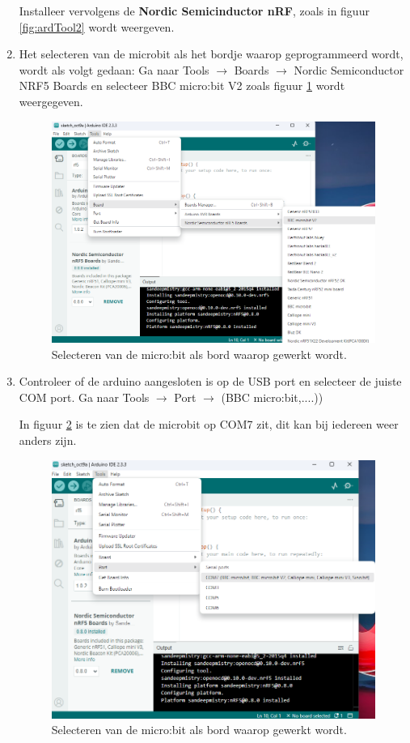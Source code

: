 \begin{enumerate}
\begin{figure}[h!]
\end{figure}
Installeer vervolgens de \textbf{Nordic Semicinductor nRF}, zoals in figuur \ref{fig:ardTool2} wordt weergeven.

\item Het selecteren van de microbit als het bordje waarop geprogrammeerd wordt, wordt als volgt gedaan: Ga naar Tools $\rightarrow$ Boards $\rightarrow$ Nordic Semiconductor NRF5 Boards en selecteer BBC micro:bit V2 zoals figuur \ref{fig:ardTool3} wordt weergegeven.
\begin{figure}[H]
	\captionsetup{justification=centering}
	\includegraphics[width=0.60 \linewidth]{figuren/arduinoTools3}
	\centering
	\caption{Selecteren van de micro:bit als bord waarop gewerkt wordt.}
	\label{fig:ardTool3}
\end{figure}

\item Controleer of de arduino aangesloten is op de USB port en selecteer de juiste COM port. Ga naar Tools $\rightarrow$ Port $\rightarrow$ (BBC micro:bit,....))

In figuur \ref{fig:ardTool4} is te zien dat de microbit op COM7 zit, dit kan bij iedereen weer anders zijn.
\begin{figure}[H]
	\captionsetup{justification=centering}
	\includegraphics[width=0.60 \linewidth]{figuren/arduinoTools4}
	\centering
	\caption{Selecteren van de micro:bit als bord waarop gewerkt wordt.}
	\label{fig:ardTool4}
\end{figure}


\end{enumerate}
